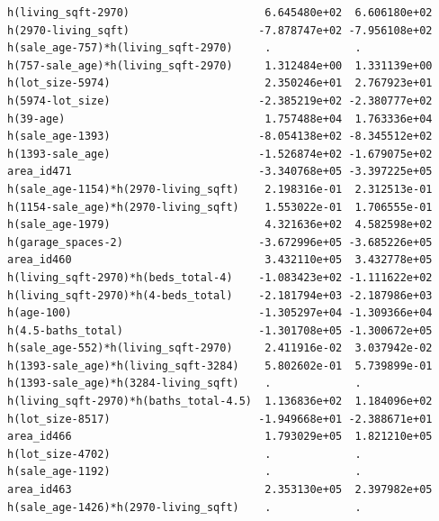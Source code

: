 \documentclass[
]{article}
\begin{document}
\begin{verbatim}
h(living_sqft-2970)                     6.645480e+02  6.606180e+02
h(2970-living_sqft)                    -7.878747e+02 -7.956108e+02
h(sale_age-757)*h(living_sqft-2970)     .             .           
h(757-sale_age)*h(living_sqft-2970)     1.312484e+00  1.331139e+00
h(lot_size-5974)                        2.350246e+01  2.767923e+01
h(5974-lot_size)                       -2.385219e+02 -2.380777e+02
h(39-age)                               1.757488e+04  1.763336e+04
h(sale_age-1393)                       -8.054138e+02 -8.345512e+02
h(1393-sale_age)                       -1.526874e+02 -1.679075e+02
area_id471                             -3.340768e+05 -3.397225e+05
h(sale_age-1154)*h(2970-living_sqft)    2.198316e-01  2.312513e-01
h(1154-sale_age)*h(2970-living_sqft)    1.553022e-01  1.706555e-01
h(sale_age-1979)                        4.321636e+02  4.582598e+02
h(garage_spaces-2)                     -3.672996e+05 -3.685226e+05
area_id460                              3.432110e+05  3.432778e+05
h(living_sqft-2970)*h(beds_total-4)    -1.083423e+02 -1.111622e+02
h(living_sqft-2970)*h(4-beds_total)    -2.181794e+03 -2.187986e+03
h(age-100)                             -1.305297e+04 -1.309366e+04
h(4.5-baths_total)                     -1.301708e+05 -1.300672e+05
h(sale_age-552)*h(living_sqft-2970)     2.411916e-02  3.037942e-02
h(1393-sale_age)*h(living_sqft-3284)    5.802602e-01  5.739899e-01
h(1393-sale_age)*h(3284-living_sqft)    .             .           
h(living_sqft-2970)*h(baths_total-4.5)  1.136836e+02  1.184096e+02
h(lot_size-8517)                       -1.949668e+01 -2.388671e+01
area_id466                              1.793029e+05  1.821210e+05
h(lot_size-4702)                        .             .           
h(sale_age-1192)                        .             .           
area_id463                              2.353130e+05  2.397982e+05
h(sale_age-1426)*h(2970-living_sqft)    .             .           
                                                                  

\end{verbatim}
\end{document}
